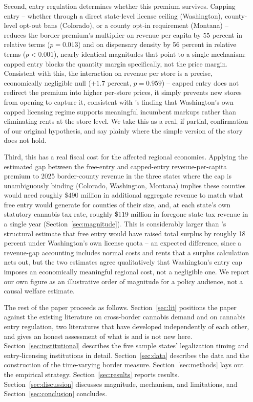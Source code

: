 \documentclass[12pt]{article}
\begin{document}
Second, entry regulation determines whether this premium survives. Capping entry -- whether through a direct
state-level license ceiling (Washington), county-level opt-out bans (Colorado), or a county opt-in requirement
(Montana) -- reduces the border premium's multiplier on revenue per capita by 55 percent in relative terms
($p=0.013$) and on dispensary density by 56 percent in relative terms ($p<0.001$), nearly identical magnitudes
that point to a single mechanism: capped entry blocks the quantity margin specifically, not the price margin.
Consistent with this, the interaction on revenue per store is a precise, economically negligible null ($+1.7$
percent, $p=0.959$) -- capped entry does not redirect the premium into higher per-store prices, it simply
prevents new stores from opening to capture it, consistent with \citet{HollenbeckUetake2021}'s finding that
Washington's own capped licensing regime supports meaningful incumbent markups rather than eliminating rents
at the store level. We take this as a real, if partial, confirmation of our original hypothesis, and say
plainly where the simple version of the story does not hold.

Third, this has a real fiscal cost for the affected regional economies. Applying the estimated gap between the
free-entry and capped-entry revenue-per-capita premium to 2025 border-county revenue in the three states where
the cap is unambiguously binding (Colorado, Washington, Montana) implies these counties would need roughly
\$490 million in additional aggregate revenue to match what free entry would generate for counties of their
size, and, at each state's own statutory cannabis tax rate, roughly \$119 million in foregone state tax revenue
in a single year (Section~\ref{sec:magnitude}). This is considerably larger than
\citet{Thomas2019LicenseQuotas}'s structural estimate that free entry would have raised total surplus by
roughly 18 percent under Washington's own license quota -- an expected difference, since a revenue-gap
accounting includes normal costs and rents that a surplus calculation nets out, but the two estimates agree
qualitatively that Washington's entry cap imposes an economically meaningful regional cost, not a negligible
one. We report our own figure as an illustrative order of magnitude for a policy audience, not a causal
welfare estimate.

The rest of the paper proceeds as follows. Section~\ref{sec:lit} positions the paper against the existing
literature on cross-border cannabis demand and on cannabis entry regulation, two literatures that have
developed independently of each other, and gives an honest assessment of what is and is not new here.
Section~\ref{sec:institutional} describes the five sample states' legalization timing and entry-licensing
institutions in detail. Section~\ref{sec:data} describes the data and the construction of the time-varying
border measure. Section~\ref{sec:methods} lays out the empirical strategy. Section~\ref{sec:results} reports
results. Section~\ref{sec:discussion} discusses magnitude, mechanism, and limitations, and
Section~\ref{sec:conclusion} concludes.
\end{document}
